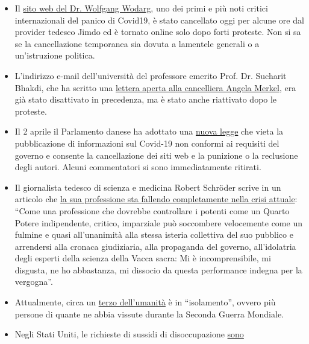 \begin{itemize}
\tightlist
\item
  Il \href{https://www.wodarg.com/}{sito web del Dr. Wolfgang Wodarg},
  uno dei primi e più noti critici internazionali del panico di Covid19,
  è stato cancellato oggi per alcune ore dal provider tedesco Jimdo ed è
  tornato online solo dopo forti proteste. Non si sa se la cancellazione
  temporanea sia dovuta a lamentele generali o a un'istruzione politica.
\item
  L'indirizzo e-mail dell'università del professore emerito Prof. Dr.
  Sucharit Bhakdi, che ha scritto una
  \href{https://swprs.org/offener-brief-von-professor-sucharit-bhakdi-an-bundeskanzlerin-dr-angela-merkel/}{lettera
  aperta alla cancelliera Angela Merkel}, era già stato disattivato in
  precedenza, ma è stato anche riattivato dopo le proteste.
\item
  Il 2 aprile il Parlamento danese ha adottato una
  \href{https://newsvoice.se/2020/04/danmark-forbjuder-corona-policy/}{nuova
  legge} che vieta la pubblicazione di informazioni sul Covid-19 non
  conformi ai requisiti del governo e consente la cancellazione dei siti
  web e la punizione o la reclusione degli autori. Alcuni commentatori
  si sono immediatamente ritirati.
\item
  Il giornalista tedesco di scienza e medicina Robert Schröder scrive in
  un articolo che
  \href{https://www.nachrichten-fabrik.de/news/harald-wiesendanger-ueber-die-massenmedien-waehrend-der-corona-krise-ich-schaeme-mich---meines-berufsstands-152103}{la
  sua professione sta fallendo completamente nella crisi attuale}:
  ``Come una professione che dovrebbe controllare i potenti come un
  Quarto Potere indipendente, critico, imparziale può soccombere
  velocemente come un fulmine e quasi all'unanimità alla stessa isteria
  collettiva del suo pubblico e arrendersi alla cronaca giudiziaria,
  alla propaganda del governo, all'idolatria degli esperti della scienza
  della Vacca sacra: Mi è incomprensibile, mi disgusta, ne ho
  abbastanza, mi dissocio da questa performance indegna per la
  vergogna''.
\item
  Attualmente, circa un
  \href{https://www.sciencealert.com/one-third-of-the-world-s-population-are-now-restricted-in-where-they-can-go}{terzo
  dell'umanità} è in ``isolamento'', ovvero più persone di quante ne
  abbia vissute durante la Seconda Guerra Mondiale.
\item
  Negli Stati Uniti, le richieste di sussidi di disoccupazione
  \href{https://www.reuters.com/article/us-health-coronavirus-usa-layoffs/us-weekly-jobless-claims-seen-at-record-high-again-idUSKBN21K0FX}{sono
}
\end{itemize}
